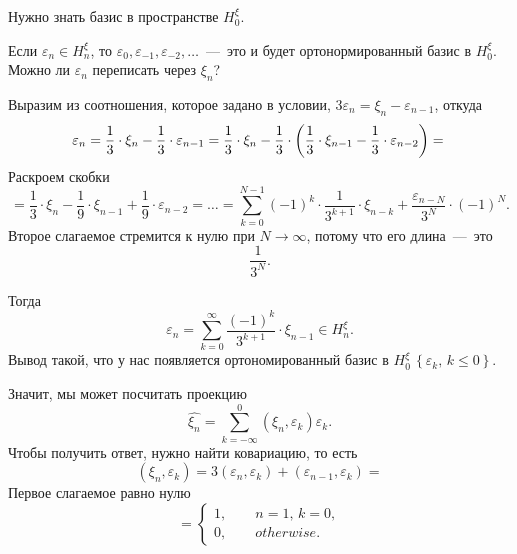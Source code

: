 Нужно знать базис в пространстве $H_0^{ \xi }$.

Если $ \varepsilon_n \in H_n^{ \xi }$,
то $ \varepsilon_0, \varepsilon_{-1}, \varepsilon_{-2}, \dotsc $~---~это
и будет ортонормированный базис в $H_0^{ \xi }$.
Можно ли $ \varepsilon_n$ переписать через $ \xi_n$?

Выразим из соотношения, которое задано в условии, $3 \varepsilon_n = \xi_n - \varepsilon_{n - 1}$,
откуда
\begin{equation*}
  \varepsilon_n =
  \frac{1}{3} \cdot \xi_n - \frac{1}{3} \cdot \varepsilon_{n - 1} =
  \frac{1}{3} \cdot \xi_n -
  \frac{1}{3} \cdot
  \left( \frac{1}{3} \cdot \xi_{n - 1} - \frac{1}{3} \cdot \varepsilon_{n - 2} \right) = \\
\end{equation*}
Раскроем скобки
\begin{equation*}
  = \frac{1}{3} \cdot \xi_n - \frac{1}{9} \cdot \xi_{n - 1} + \frac{1}{9} \cdot \varepsilon_{n - 2} =
  \dotsc =
  \sum \limits_{k = 0}^{N - 1} \left( -1 \right)^k \cdot \frac{1}{3^{k + 1}} \cdot \xi_{n - k} +
  \frac{ \varepsilon_{n - N}}{3^N} \cdot \left( -1 \right)^N.
\end{equation*}
Второе слагаемое стремится к нулю при $N \to \infty $, потому что его длина~---~это
\begin{equation*}
  \frac{1}{3^N}.
\end{equation*}

Тогда
\begin{equation*}
  \varepsilon_n =
  \sum \limits_{k = 0}^{ \infty } \frac{ \left( -1 \right)^k}{3^{k + 1}} \cdot \xi_{n - 1} \in
  H_n^{ \xi }.
\end{equation*}
Вывод такой, что у нас появляется ортономированный базис в
$H_0^{ \xi } \,
  \left\{ \varepsilon_k, \, k \leq 0 \right\} $.

Значит, мы может посчитать проекцию
\begin{equation*}
  \hat{ \xi_n} =
  \sum \limits_{k = -\infty }^0 \left( \xi_n, \varepsilon_k \right) \varepsilon_k.
\end{equation*}
Чтобы получить ответ, нужно найти ковариацию, то есть
\begin{equation*}
  \left( \xi_n, \varepsilon_k \right) =
  3 \left( \varepsilon_n, \varepsilon_k \right) +
  \left( \varepsilon_{n - 1}, \varepsilon_k \right) =
\end{equation*}
Первое слагаемое равно нулю
\begin{equation*}
  = \begin{cases}
    1, \qquad n = 1, \, k = 0, \\
    0, \qquad otherwise.
  \end{cases}
\end{equation*}


